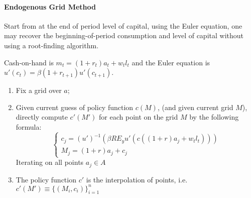 \documentclass[11pt,a4paper]{article}
\begin{document}
\paragraph{Endogenous Grid Method\citep{carrollMethodEndogenousGridpoints2006}} Start from at the end of period level of capital, using the Euler equation, one may recover the beginning-of-period consumption and level of capital without using a root-finding algorithm. 

Cash-on-hand is $m_t = (1+r_t)a_t + w_t l_t$ and the Euler equation is $u'(c_t) = \beta (1+r_{t+1})u'(c_{t+1})$.
\begin{enumerate}
    \item Fix a grid over $a$; 
    \item Given current guess of policy function $c(M)$, (and given current grid $M$), directly compute $c'(M')$ for each point on the grid $M$ by the following formula: 
    $$ \begin{cases}
        c_j = (u')^{-1}\left(\beta R E_y u'(c((1+r)a_j+w_tl_t))\right)\\ 
        M_j = (1+r)a_j+c_j
    \end{cases}  $$
    Iterating on all points $a_j\in A$
    \item The policy function $c'$ is the interpolation of points, i.e. $c'(M') \equiv \{(M_i,c_i)\}_{i=1}^n$
\end{enumerate}
\end{document}
